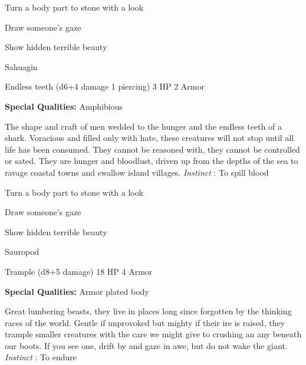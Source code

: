 \startitemize[1,packed]
         
\item Turn a body part to stone with a look

         
\item Draw someone's gaze

         
\item Show hidden terrible beauty

       
\stopitemize
       
\startMonsterName
Sahuagin	 
\stopMonsterName
       

Endless teeth (d6+4 damage 1 piercing)	3 HP	2 Armor

       


       
\startMonsterQualities
         {\bf Special Qualities:}  Amphibious
\stopMonsterQualities
       
\startMonsterDescription
The shape and craft of men wedded to the hunger and the endless teeth of a shark. Voracious and filled only with hate, these creatures will not stop until all life has been consumed. They cannot be reasoned with, they cannot be controlled or sated. They are hunger and bloodlust, driven up from the depths of the sea to ravage coastal towns and swallow island villages. {\em Instinct} : To spill blood
\stopMonsterDescription
       
\startitemize[1,packed]
         
\item Turn a body part to stone with a look

         
\item Draw someone's gaze

         
\item Show hidden terrible beauty

       
\stopitemize
       
\startMonsterName
Sauropod	 
\stopMonsterName
       

Trample (d8+5 damage)	18 HP	4 Armor

       


       
\startMonsterQualities
         {\bf Special Qualities:}  Armor plated body
\stopMonsterQualities
       
\startMonsterDescription
Great lumbering beasts, they live in places long since forgotten by the thinking races of the world. Gentle if unprovoked but mighty if their ire is raised, they trample smaller creatures with the care we might give to crushing an any beneath our boots. If you see one, drift by and gaze in awe, but do not wake the giant. {\em Instinct} : To endure
\stopMonsterDescription
       
